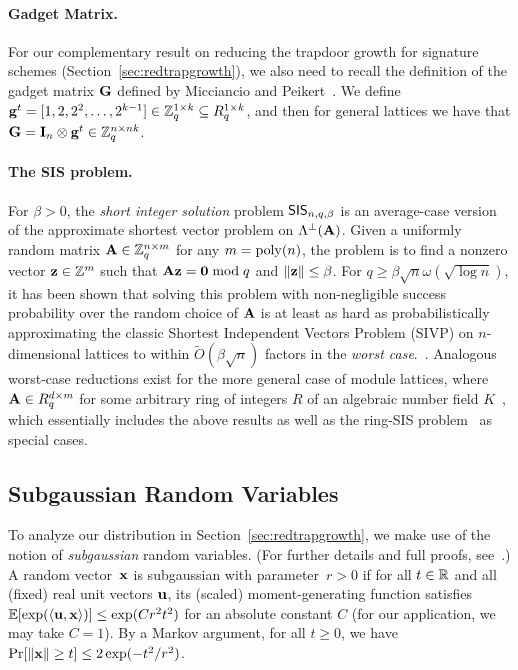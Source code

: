 \paragraph{Gadget Matrix.} For our
complementary result on reducing the trapdoor growth for signature schemes
(Section~\ref{sec:redtrapgrowth}), we also need to recall the definition
of the gadget matrix $\mathbf{G}$ defined by Micciancio and
Peikert~\cite{DBLP:conf/eurocrypt/MicciancioP12}. We define $\mathbf{g}^{t}=[1,2,2^2,\ldots,2^{k-1}] \in \mathbb{Z}_q^{1 \times k}
\subseteq R_q^{1 \times k}$,
and then for general lattices we have that $\mathbf{G} = \mathbf{I}_{n}
\otimes \mathbf{g}^{t} \in \mathbb{Z}_q^{n \times nk}$.

\paragraph{The SIS problem.} For $\beta > 0$, the \emph{short integer
  solution} problem $\mathsf{SIS}_{n,q,\beta}$ is an average-case version of the
approximate shortest vector problem on $\Lambda^{\perp}(\mathbf{A})$. Given a
uniformly random matrix $\mathbf{A} \in \mathbb{Z}_q^{n \times m}$ for any
$m=\operatorname{poly}(n)$, the problem is to find a nonzero vector $\mathbf{z} \in \mathbb{Z}^m$
such that $\mathbf{A}\mathbf{z}=\mathbf{0} \bmod{q}$ and $\lVert\mathbf{z}\rVert \leq
\beta$. For $q \geq \beta\sqrt{n}\omega(\sqrt{\log{n}})$, it has been
shown that solving this problem with non-negligible success
probability over the random choice of $\mathbf{A}$ is at least as hard as
probabilistically approximating the classic Shortest Independent Vectors
Problem (SIVP) on $n$-dimensional lattices to within
$\tilde{O}(\beta\sqrt{n})$ factors in the \emph{worst
  case}.~\cite{ajtai04:_gener_hard_instan_lattic_probl,DBLP:journals/siamcomp/MicciancioR07,DBLP:conf/stoc/GentryPV08}. Analogous
worst-case reductions exist for the more general case of module lattices, where
$\mathbf{A} \in R_q^{d \times m}$ for some arbitrary ring of integers $R$
of an
algebraic number field $K$~\cite{DBLP:journals/dcc/LangloisS15}, which
essentially includes the above results as well as the ring-SIS problem~\cite{DBLP:conf/tcc/PeikertR06,DBLP:conf/icalp/LyubashevskyM06}
as special cases.
\subsection{Subgaussian Random Variables}
\label{sec:subgauss}

To analyze our distribution in Section~\ref{sec:redtrapgrowth}, we
make use of the notion of \emph{subgaussian} random variables.  (For
further details and full proofs,
see~\cite{vershynin12:_compr_sensin_theor_applic}.)  A random
vector~$\mathbf{x}$ is subgaussian with parameter~$r > 0$ if for all $t \in \mathbb{R}$
and all (fixed) real unit vectors $\mathbf{u}$, its (scaled)
moment-generating function satisfies
$\operatorname*{\mathbb{E}}[\exp(\langle\mathbf{u},\mathbf{x}\rangle)] \leq \exp(C r^{2} t^{2})$ for an
absolute constant $C$ (for our application, we may take $C=1$).  By a Markov
argument, for all $t \geq 0$, we have
$\Pr[\lVert\mathbf{x}\rVert \geq t] \leq 2 \exp(- t^{2}/r^{2})$.

